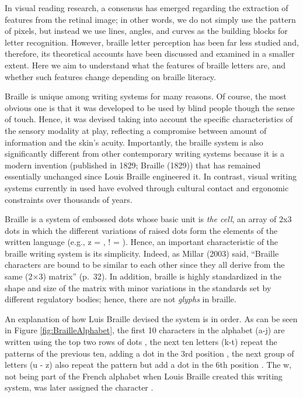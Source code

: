 \documentclass[
  english,
  man]{apa7}
\begin{document}
In visual reading research, a consensus has emerged regarding the extraction of features from the retinal image; in other words, we do not simply use the pattern of pixels, but instead we use lines, angles, and curves as the building blocks for letter recognition. However, braille letter perception has been far less studied and, therefore, its theoretical accounts have been discussed and examined in a smaller extent. Here we aim to understand what the features of braille letters are, and whether such features change depending on braille literacy.

Braille is unique among writing systems for many reasons. Of course, the most obvious one is that it was developed to be used by blind people though the sense of touch. Hence, it was devised taking into account the specific characteristics of the sensory modality at play, reflecting a compromise between amount of information and the skin's acuity. Importantly, the braille system is also significantly different from other contemporary writing systems because it is a modern invention (published in 1829; Braille (1829)) that has remained essentially unchanged since Louis Braille engineered it. In contrast, visual writing systems currently in used have evolved through cultural contact and ergonomic constraints over thousands of years.

Braille is a system of embossed dots whose basic unit is \emph{the cell}, an array of 2x3 dots in which the different variations of raised dots form the elements of the written language (e.g., z = , ! = \braille{!}). Hence, an important characteristic of the braille writing system is its simplicity. Indeed, as Millar (2003) said, ``Braille characters are bound to be similar to each other since they all derive from the same (2×3) matrix'' (p.~32). In addition, braille is highly standardized in the shape and size of the matrix with minor variations in the standards set by different regulatory bodies; hence, there are not \emph{glyphs} in braille.

An explanation of how Luis Braille devised the system is in order. As can be seen in Figure \ref{fig:BrailleAlphabet}, the first 10 characters in the alphabet (a-j) are written using the top two rows of dots , the next ten letters (k-t) repeat the patterns of the previous ten, adding a dot in the 3rd position , the next group of letters (u - z) also repeat the pattern but add a dot in the 6th position . The w, not being part of the French alphabet when Louis Braille created this writing system, was later assigned the character .
\end{document}
